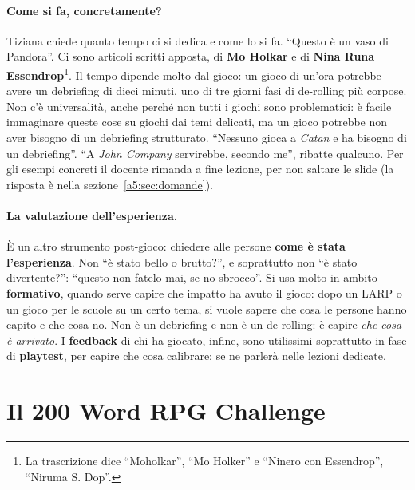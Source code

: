 \paragraph{Come si fa, concretamente?} Tiziana chiede quanto tempo ci si dedica e come
lo si fa. ``Questo è un vaso di Pandora''. Ci sono articoli scritti apposta, di
\textbf{Mo Holkar} e di \textbf{Nina Runa Essendrop}\footnote{La trascrizione dice
``Moholkar'', ``Mo Holker'' e ``Ninero con Essendrop'', ``Niruma S. Dop''.}. Il tempo
dipende molto dal gioco: un gioco di un'ora potrebbe avere un debriefing di dieci
minuti, uno di tre giorni fasi di de-rolling più corpose. Non c'è universalità, anche
perché non tutti i giochi sono problematici: è facile immaginare queste cose su giochi
dai temi delicati, ma un gioco potrebbe non aver bisogno di un debriefing strutturato.
``Nessuno gioca a \emph{Catan} e ha bisogno di un debriefing''. ``A \emph{John Company}
servirebbe, secondo me'', ribatte qualcuno. Per gli esempi concreti il docente rimanda
a fine lezione, per non saltare le slide (la risposta è nella
sezione~\ref{a5:sec:domande}).

\paragraph{La valutazione dell'esperienza.} È un altro strumento post-gioco: chiedere
alle persone \textbf{come è stata l'esperienza}. Non ``è stato bello o brutto?'', e
soprattutto non ``è stato divertente?'': ``questo non fatelo mai, se no sbrocco''. Si
usa molto in ambito \textbf{formativo}, quando serve capire che impatto ha avuto il
gioco: dopo un LARP o un gioco per le scuole su un certo tema, si vuole sapere che
cosa le persone hanno capito e che cosa no. Non è un debriefing e non è un de-rolling:
è capire \emph{che cosa è arrivato}. I \textbf{feedback} di chi ha giocato, infine,
sono utilissimi soprattutto in fase di \textbf{playtest}, per capire che cosa
calibrare: se ne parlerà nelle lezioni dedicate.

\section{Il 200 Word RPG Challenge}
\label{a5:sec:200}



